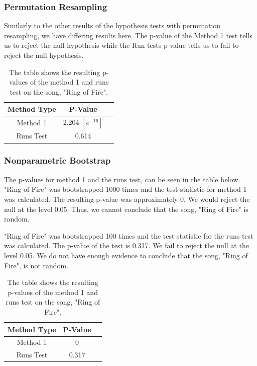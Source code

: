 \documentclass[12pt, letterpaper]{article}
\begin{document}
\subsubsection{Permutation Resampling}
Similarly to the other results of the hypothesis tests with permutation resampling, we have differing results here. The p-value of the Method 1 test tells us to reject the null hypothesis while the Run tests p-value tells us to fail to reject the null hypothesis.
\begin{table}[h]
\begin{center}
\begin{tabular}{|c|c|c|}
\hline
\textbf{Method Type} & P-Value  \\
\hline
Method 1 & 2.204 $[e^{-16}]$ \\
\hline
Runs Test & 0.614 \\ 
\hline
\end{tabular}
\end{center}
\caption{The table shows the resulting p-values of the method 1 and runs test on the song, "Ring of Fire".}
\label{fig: P-values for "Ring of Fire": Permutation Resampling}
\end{table}

\subsubsection{Nonparametric Bootstrap}
The p-values for method 1 and the runs test, can be seen in the table below. "Ring of Fire" was bootstrapped 1000 times and the test statistic for method 1 was calculated. The resulting p-value was approximately 0. We would reject the null at the level 0.05. Thus, we cannot conclude that the song, "Ring of Fire" is random. 

"Ring of Fire" was bootstrapped 100 times and the test statistic for the runs test was calculated. The p-value of the test is 0.317. We fail to reject the null at the level 0.05. We do not have enough evidence to conclude that the song, "Ring of Fire", is not random.
\begin{table}[h]
\begin{center}
\begin{tabular}{|c|c|c|}
\hline
\textbf{Method Type} & P-Value \\
\hline
Method 1 & 0  \\
\hline
Runs Test & 0.317 \\ 
\hline
\end{tabular}
\end{center}
\caption{The table shows the resulting p-values of the method 1 and runs test on the song, "Ring of Fire".}
\label{fig: P-values for "Ring of Fire": Nonparametric Bootstrap}
\end{table}
\end{document}
